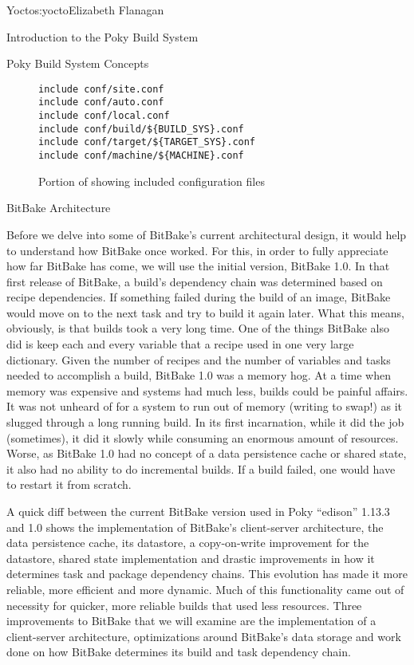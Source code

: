 \begin{aosachapter}{Yocto}{s:yocto}{Elizabeth Flanagan}
\begin{aosasect1}{Introduction to the Poky Build System}
\begin{aosasect2}{Poky Build System Concepts}
\begin{figure}
\begin{verbatim}
include conf/site.conf
include conf/auto.conf
include conf/local.conf
include conf/build/${BUILD_SYS}.conf
include conf/target/${TARGET_SYS}.conf
include conf/machine/${MACHINE}.conf
\end{verbatim}
\caption{Portion of  showing included configuration files}
\label{fig.yocto.included}
\end{figure}

\end{aosasect2}

\end{aosasect1}

\begin{aosasect1}{BitBake Architecture}

Before we delve into some of BitBake's current architectural design,
it would help to understand how BitBake once worked. For this, in
order to fully appreciate how far BitBake has come, we will use the
initial version, BitBake 1.0. In that first release of BitBake, a
build's dependency chain was determined based on recipe
dependencies. If something failed during the build of an image,
BitBake would move on to the next task and try to build it again later.
What this means, obviously, is that builds took a very long time. One
of the things BitBake also did is keep each and every variable that a
recipe used in one very large dictionary. Given the number of recipes
and the number of variables and tasks needed to accomplish a build,
BitBake 1.0 was a memory hog. At a time when memory was expensive and
systems had much less, builds could be painful affairs. It was not
unheard of for a system to run out of memory (writing to swap!)  as it
slugged through a long running build. In its first incarnation, while
it did the job (sometimes), it did it slowly while consuming an enormous
amount of resources. Worse, as BitBake 1.0 had no concept of a data persistence
cache or shared state, it also had no ability to do incremental
builds. If a build failed, one would have to restart it from
scratch.

A quick diff between the current BitBake version used in Poky
``edison'' 1.13.3 and 1.0 shows the implementation of BitBake's
client-server architecture, the data persistence cache, its datastore,
a copy-on-write improvement for the datastore, shared state
implementation and drastic improvements in how it determines task
and package dependency chains. This evolution has made it more
reliable, more efficient and more dynamic. Much of this functionality
came out of necessity for quicker, more reliable builds that used less
resources. Three improvements to BitBake that we will examine are the
implementation of a client-server architecture, optimizations around
BitBake's data storage and work done on how BitBake determines its
build and task dependency chain.


\end{aosasect1}
\end{aosachapter}

